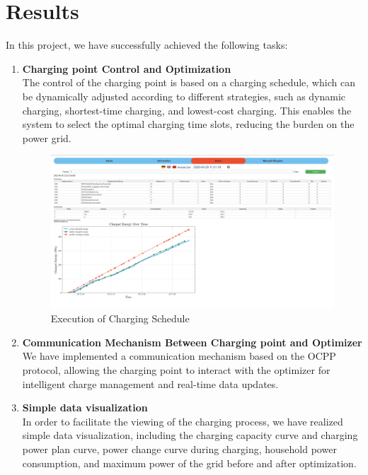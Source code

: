 \documentclass[
	english,
	ruledheaders=section,%
	class=report,%
	thesis={type=Report},%
	accentcolor=9c,%
	custommargins=true,%
	marginpar=false,%
	parskip=half-,%
	fontsize=11pt,%
	logofile={img/tuda_logo.pdf}, %
]{tudapub}
\begin{document}
\section{Results}
\label{sec: results}
In this project, we have successfully achieved the following tasks:

\begin{enumerate}
    \item \textbf{Charging point Control and Optimization}\\
    The control of the charging point is based on a charging schedule, which can be dynamically adjusted according to different strategies, such as dynamic charging, shortest-time charging, and lowest-cost charging. This enables the system to select the optimal charging time slots, reducing the burden on the power grid.
    \begin{figure}[H]
        \centering
        \includegraphics[width=0.8\linewidth]{img/optimizer_charge_plan.png}
        \caption{Execution of Charging Schedule}
        \label{fig:optimizer_charge_plan}
    \end{figure}
    
    \item \textbf{Communication Mechanism Between Charging point and Optimizer}\\
    We have implemented a communication mechanism based on the \ac{OCPP} protocol, allowing the charging point to interact with the optimizer for intelligent charge management and real-time data updates.
    
    \item \textbf{Simple data visualization}\\   
    In order to facilitate the viewing of the charging process, we have realized simple data visualization, including the charging capacity curve and charging power plan curve, power change curve during charging, household power consumption, and maximum power of the grid before and after optimization.
    

\end{enumerate}
\end{document}
